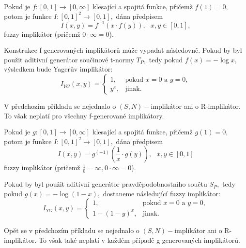 \begin{sentence}\cite{yager} 
Pokud je $f: [0,1] \to [0,\infty]$ klesající a spojitá funkce,
přičemž $f(1) = 0,$ potom je funkce $I: [0,1]^2 \to [0,1],$ dána předpisem
$$I(x,y) = f^{-1}(x \cdot f(y)), \mbox {   } x, y \in [0,1],$$
fuzzy implikátor (pričemž $0 \cdot \infty = 0$). \\
\end{sentence}

\begin{example}
    \cite{Springer}
    Konstrukce f-generovaných implikátor\r u m\r uže vypadat následovně.
    Pokud by byl použit aditivní generátor součinové t-normy $T_P,$ tedy 
    pokud $f(x) = - \log x,$ výsledkem bude Yager\r uv implikátor:
    $$I_{YG}(x,y)= \begin{cases} 1,
    &\mbox {pokud $x=0$ a $y=0,$} \\
    y^x, &\mbox {jinak.}
    \end{cases}$$
\end{example}
\begin{remark}
    V předchozím příkladu se nejednalo o $(S,N)-$implikátor ani o R-implikátor. To však neplatí pro všechny f-generované implikátory.
\end{remark}


\begin{sentence}\cite{yager} 
Pokud je $g: [0,1] \to [0,\infty]$ klesající a spojitá funkce,
přičemž $g(1) = 0,$ potom je funkce $I: [0,1]^2 \to [0,1],$ dána předpisem
$$I(x,y) = g^{(-1)}\left (\frac 1x \cdot g(y)\right ), \mbox {   } x, y \in [0,1]$$
fuzzy implikátor (pričemž $\frac{1}{0} = \infty, 0 \cdot \infty = 0$). \\
\end{sentence}
\begin{example}
    \cite{Springer}
    Pokud by byl použit aditivní generátor pravděpodobnostního součtu $S_P,$ tedy 
    pokud $g(x) = - \log (1- x),$ dostaneme následující fuzzy implikátor:
    $$I_{YG}(x,y)= \begin{cases} 1,
    &\mbox {pokud $x=0$ a $y=0,$} \\
    1-(1-y)^x, &\mbox {jinak.}
        \end{cases}$$
\end{example}
\begin{remark}
    Opět se v předchozím příkladu se nejednalo o $(S,N)-$implikátor ani o R-implikátor. To však také neplatí v každém případě g-generovaných implikátor\r u.
\end{remark}

